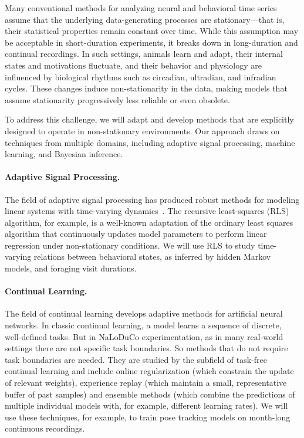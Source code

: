 \label{sec:non-stationarity}

Many conventional methods for analyzing neural and behavioral time series
assume that the underlying data-generating processes are stationary—that is,
their statistical properties remain constant over time. While this assumption
may be acceptable in short-duration experiments, it breaks down in
long-duration and continual recordings. In such settings, animals
learn and adapt, their internal states and motivations fluctuate, and their
behavior and physiology are influenced by biological rhythms such as circadian,
ultradian, and infradian cycles. These changes induce non-stationarity in the
data, making models that assume stationarity progressively less reliable or
even obsolete.

To address this challenge, we will adapt and develop methods that are
explicitly designed to operate in non-stationary environments. Our approach
draws on techniques from multiple domains, including adaptive signal
processing, machine learning, and Bayesian inference.

\paragraph{Adaptive Signal Processing.}

The field of adaptive signal processing has produced robust methods for
modeling linear systems with time-varying dynamics~\citep{haykin02}.
%
The recursive least-squares (RLS) algorithm, for example, is a well-known
adaptation of the ordinary least squares algorithm that continuously updates
model parameters to perform linear regression under non-stationary conditions.
%
We will use RLS to study time-varying relations between
behavioral states, as inferred by hidden Markov models, and foraging visit
durations.

\paragraph{Continual Learning.}

The field of continual learning develops adaptive methods for
artificial neural networks.  In classic continual learning, a model learns a
sequence of discrete, well-defined tasks.  But in NaLoDuCo experimentation, as
in many real-world settings there are not specific task boundaries. So methods
that do not require task boundaries are needed. They are studied by the
subfield of task-free continual learning and include online
regularization (which constrain the update of relevant weights), experience
replay (which maintain a small, representative buffer of past samples) and
ensemble methods (which combine the predictions of multiple individual models
with, for example, different learning rates).
%
We will use these techniques, for example, to train pose tracking models on
month-long continuous recordings.

